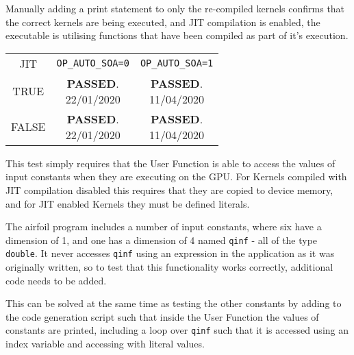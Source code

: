\par
Manually adding a print statement to only the re-compiled kernels confirms that the correct kernels are being executed, and JIT compilation is enabled, the executable is utilising functions that have been compiled as part of it's execution.
\begin{table}[b]
\raggedleft
\renewcommand{\arraystretch}{2.5}
\begin{tabular}{| c || c | c |}
\hline
JIT & \verb|OP_AUTO_SOA=0| & \verb|OP_AUTO_SOA=1| \\
\hhline{|=|=|=|}
TRUE & \shortstack{\textbf{\textcolor{green!20!black}{PASSED}}.\\22/01/2020} &\shortstack{\textbf{\textcolor{green!20!black}{PASSED}}.\\11/04/2020} \\
\hline
FALSE&\shortstack{\textbf{\textcolor{green!20!black}{PASSED}}.\\22/01/2020} &\shortstack{\textbf{\textcolor{green!20!black}{PASSED}}.\\11/04/2020} \\
\hline
\end{tabular}
\hspace{-0.5cm}
\end{table}

This test simply requires that the User Function is able to access the values of input constants when they are executing on the GPU. For Kernels compiled with JIT compilation disabled this requires that they are copied to device memory, and for JIT enabled Kernels they must be defined literals.
\par
The airfoil program includes a number of input constants, where six have a dimension of 1, and one has a dimension of 4 named \verb|qinf| - all of the type \verb|double|. It never accesses \verb|qinf| using an expression in the application as it was originally written, so to test that this functionality works correctly, additional code needs to be added.
\par This can be solved at the same time as testing the other constants by adding to the code generation script such that inside the User Function the values of constants are printed, including a loop over \verb|qinf| such that it is accessed using an index variable and accessing with literal values.

